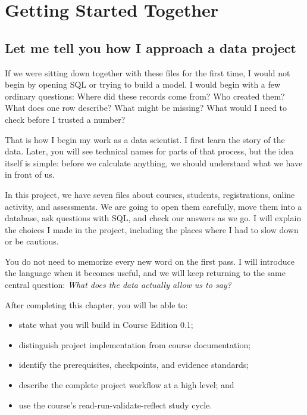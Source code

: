 \chapter{Getting Started Together}
\label{ch:orientation}

\section*{Let me tell you how I approach a data project}

If we were sitting down together with these files for the first time, I would
not begin by opening SQL or trying to build a model. I would begin with a few
ordinary questions: Where did these records come from? Who created them? What
does one row describe? What might be missing? What would I need to check before
I trusted a number?

That is how I begin my work as a data scientist. I first learn the story of the
data. Later, you will see technical names for parts of that process, but the
idea itself is simple: before we calculate anything, we should understand what
we have in front of us.

In this project, we have seven files about courses, students, registrations,
online activity, and assessments. We are going to open them carefully, move
them into a database, ask questions with SQL, and check our answers as we go.
I will explain the choices I made in the project, including the places where I
had to slow down or be cautious.

You do not need to memorize every new word on the first pass. I will introduce
the language when it becomes useful, and we will keep returning to the same
central question: \emph{What does the data actually allow us to say?}

\begin{learningobjectives}
After completing this chapter, you will be able to:
\begin{itemize}
  \item state what you will build in Course Edition 0.1;
  \item distinguish project implementation from course documentation;
  \item identify the prerequisites, checkpoints, and evidence standards;
  \item describe the complete project workflow at a high level; and
  \item use the course's read-run-validate-reflect study cycle.
\end{itemize}
\end{learningobjectives}

